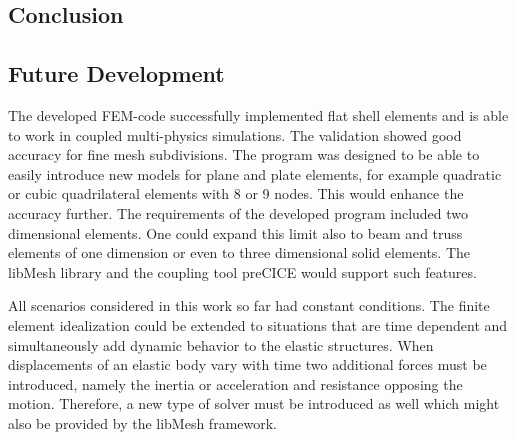 
 
 \subsection{Conclusion}
 

 \subsection{Future Development}
  The developed FEM-code successfully implemented flat shell elements and is able to work in coupled multi-physics simulations. The validation showed good accuracy for fine mesh subdivisions. The program was designed to be able to easily introduce new models for plane and plate elements, for example quadratic or cubic quadrilateral elements with 8 or 9 nodes. This would enhance the accuracy further. The requirements of the developed program included two dimensional elements. One could expand this limit also to beam and truss elements of one dimension or even to three dimensional solid elements. The libMesh library and the coupling tool preCICE would support such features.
  
  All scenarios considered in this work so far had constant conditions. The finite element idealization could be extended to situations that are time dependent and simultaneously add dynamic behavior to the elastic structures. When displacements of an elastic body vary with time two additional forces must be introduced, namely the inertia or acceleration and resistance opposing the motion. Therefore, a new type of solver must be introduced as well which might also be provided by the libMesh framework.
\newpage
